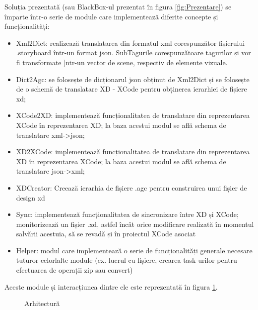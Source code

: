 Soluția prezentată (sau BlackBox-ul prezentat în figura \ref{fig:Prezentare}) se împarte într-o serie de module care implementează diferite concepte și funcționalități:
\begin{itemize} 
\item Xml2Dict: realizează translatarea din formatul xml corespunzător fișierului .storyboard într-un format json. SubTagurile corespunzătoare tagurilor  și  vor fi transformate ]ntr-un vector de scene, respectiv de elemente vizuale.
\item Dict2Agc: se folosește de dicționarul json obținut de Xml2Dict și se folosește de o schemă de translatare XD - XCode pentru obținerea ierarhiei de fișiere xd;
\item XCode2XD: implementează funcționalitatea de translatare din reprezentarea XCode în reprezentarea XD; la baza acestui modul se află schema de translatare xml->json;
\item XD2XCode: implementează funcționalitatea de translatare din reprezentarea XD în reprezentarea XCode; la baza acestui modul se află schema de translatare json->xml;
\item XDCreator: Creează ierarhia de fișiere .agc pentru construirea unui fișier de design xd
\item Sync: implementează funcționalitatea de sincronizare între XD și XCode; monitorizează un fișier .xd, astfel încât orice modificare realizată în momentul salvării acestuia, să se revadă și în proiectul XCode asociat
\item Helper: modul care implementează o serie de funcționalități generale necesare tuturor celorlalte module (ex. lucrul cu fișiere, crearea task-urilor pentru efectuarea de operații zip sau convert)
\end{itemize}

Aceste module și interacțiunea dintre ele este reprezentată în figura \ref{fig:Arhitectura}.

\begin{figure}[!htbp]
\centering
{}
\caption{Arhitectură} \label{fig:Arhitectura}
\end{figure}

